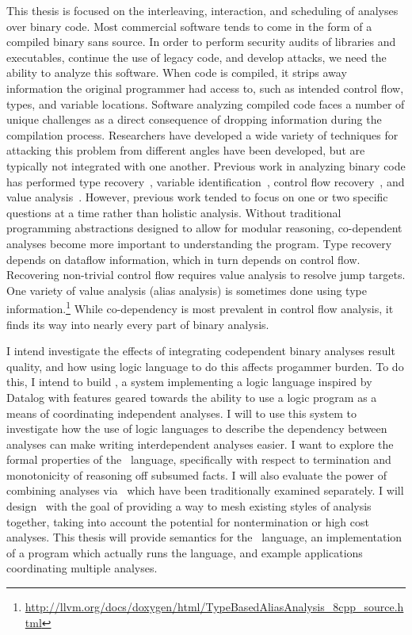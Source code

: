 This thesis is focused on the interleaving, interaction, and scheduling of analyses over binary code.
Most commercial software tends to come in the form of a compiled binary sans source.
In order to perform security audits of libraries and executables, continue the use of legacy code, and develop attacks, we need the ability to analyze this software.
When code is compiled, it strips away information the original programmer had access to, such as intended control flow, types, and variable locations.
Software analyzing compiled code faces a number of unique challenges as a direct consequence of dropping information during the compilation process.
Researchers have developed a wide variety of techniques for attacking this problem from different angles have been developed, but are typically not integrated with one another.
Previous work in analyzing binary code has performed type recovery~\cite{bitr}, variable identification~\cite{divine}, control flow recovery~\cite{jakstab,phoenix}, and value analysis~\cite{vsa}.
However, previous work tended to focus on one or two specific questions at a time rather than holistic analysis.
Without traditional programming abstractions designed to allow for modular reasoning, co-dependent analyses become more important to understanding the program.
Type recovery depends on dataflow information\cite{bitr,tie,sndwrite}, which in turn depends on control flow.
Recovering non-trivial control flow requires value analysis to resolve jump targets.
One variety of value analysis (alias analysis) is sometimes done using type information.\footnote {
  \url{http://llvm.org/docs/doxygen/html/TypeBasedAliasAnalysis_8cpp_source.html}
}
While co-dependency is most prevalent in control flow analysis, it finds its way into nearly every part of binary analysis.

I intend investigate the effects of integrating codependent binary analyses result quality, and how using logic language to do this affects progammer burden.
To do this, I intend to build \sysname, a system implementing a logic language inspired by Datalog with features geared towards the ability to use a logic program as a means of coordinating independent analyses.
I will to use this system to investigate how the use of logic languages to describe the dependency between analyses can make writing interdependent analyses easier.
I want to explore the formal properties of the \sysname\ language, specifically with respect to termination and monotonicity of reasoning off subsumed facts.
I will also evaluate the power of combining analyses via \sysname\ which have been traditionally examined separately.
I will design \sysname\ with the goal of providing a way to mesh existing styles of analysis together, taking into account the potential for nontermination or high cost analyses.
This thesis will provide semantics for the \sysname\ language, an implementation of a program which actually runs the language, and example applications coordinating multiple analyses.
